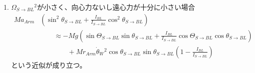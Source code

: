 \documentclass[a4paper,11pt]{jsarticle}
\begin{document}
\begin{enumerate}
  \item $\Omega_{S\rightarrow BL}{}^2$が小さく、向心力ないし遠心力が十分に小さい場合
  \begin{align*}
    Ma_{Arm}
    &\left( \sin^2\theta_{S\rightarrow BL} + \frac{I_{BL}}{I_{S\rightarrow BL}}\cos^2\theta_{S\rightarrow BL} \right)
    \\
    & \qquad \approx - Mg\left( \sin\Theta_{S\rightarrow BL} \sin\theta_{S\rightarrow BL} + \frac{I_{BL}}{I_{S\rightarrow BL}}\cos\Theta_{S\rightarrow BL} \cos\theta_{S\rightarrow BL} \right)  
    \\
    & \qquad \qquad + Mr_{Arm}\dot{\theta}_W{}^2\cos\theta_{S\rightarrow BL} \sin\theta_{S\rightarrow BL}\left( 1 - \frac{I_{BL}}{I_{S\rightarrow BL}} \right)
  \end{align*}
  という近似が成り立つ。
\end{enumerate}
\end{document}
